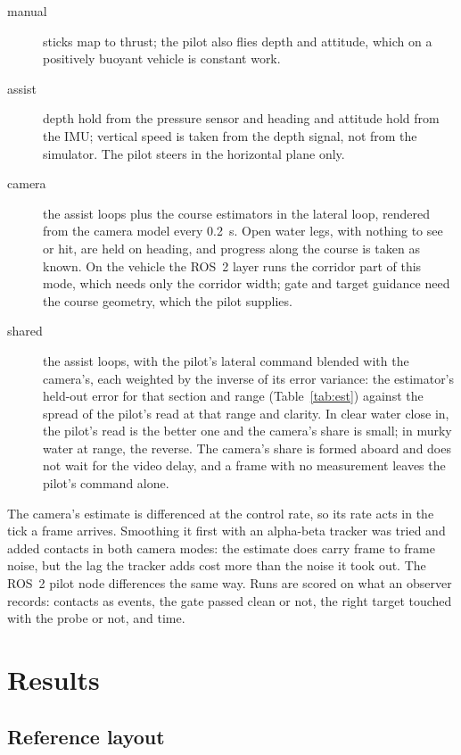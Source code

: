 \documentclass[10pt,a4paper]{article}
\begin{document}
\begin{description}
\item[manual] sticks map to thrust; the pilot also flies depth and attitude,
which on a positively buoyant vehicle is constant work.
\item[assist] depth hold from the pressure sensor and heading and attitude
hold from the IMU; vertical speed is taken from the depth signal, not from
the simulator. The pilot steers in the horizontal plane only.
\item[camera] the assist loops plus the course estimators in the lateral loop,
rendered from the camera model every \SI{0.2}{\second}. Open water legs, with
nothing to see or hit, are held on heading, and progress along the course is
taken as known. On the vehicle the ROS~2 layer runs the corridor part of this
mode, which needs only the corridor width; gate and target guidance need the
course geometry, which the pilot supplies.
\item[shared] the assist loops, with the pilot's lateral command blended with
the camera's, each weighted by the inverse of its error variance: the
estimator's held-out error for that section and range (Table~\ref{tab:est})
against the spread of the pilot's read at that range and clarity. In clear
water close in, the pilot's read is the better one and the camera's share is
small; in murky water at range, the reverse. The camera's share is formed
aboard and does not wait for the video delay, and a frame with no measurement
leaves the pilot's command alone.
\end{description}
The camera's estimate is differenced at the control rate, so its rate acts
in the tick a frame arrives. Smoothing it first with an alpha-beta tracker was
tried and added contacts in both camera modes: the estimate does carry frame
to frame noise, but the lag the tracker adds cost more than the noise it took
out. The ROS~2 pilot node differences the same way.
Runs are scored on what an observer records: contacts as events, the gate
passed clean or not, the right target touched with the probe or not, and time.

\section{Results}

\subsection{Reference layout}
\end{document}
